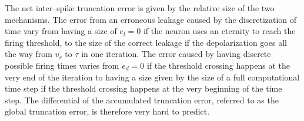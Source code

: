 
 	The net inter--spike truncation error is given by the relative size of the two mechanisms.
	The error from an erroneous leakage caused by the discretization of time vary from having a size of $e_l=0$ if the neuron uses an eternity to reach the firing threshold,
		 to the size of the correct leakage if the depolarization goes all the way from $v_r$ to $\tau$ in one iteration.
	The error caused by having discrete possible firing times varies from $e_d=0$ if the threshold crossing happens at the very end of the iteration to 
		having a size given by the size of a full computational time step if the threshold crossing happens    at the very beginning of the time step. %
	The differential of the accumulated truncation error, referred to as the global truncation error, is therefore very hard to predict. %
